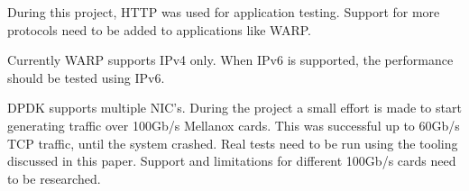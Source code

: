 During this project, HTTP was used for application testing. Support for more protocols need to be added to applications like WARP. 

Currently WARP supports IPv4 only. When IPv6 is supported, the performance should be tested using IPv6. 

DPDK supports multiple NIC's. During the project a small effort is made to start generating traffic over 100Gb/s Mellanox cards.
This was successful up to 60Gb/s TCP traffic, until the system crashed. Real tests need to be run using the tooling discussed in this paper. 
Support and limitations for different 100Gb/s cards need to be researched.   
